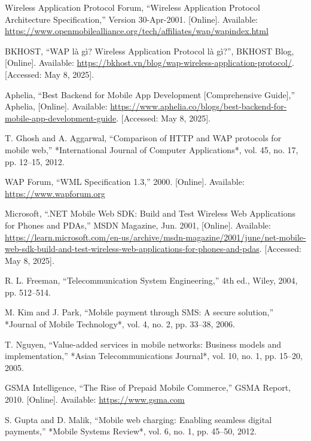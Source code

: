 \documentclass[12pt]{report}
\begin{document}
\begin{thebibliography}{1}
  Wireless Application Protocol Forum, ``Wireless Application Protocol Architecture Specification,'' Version 30-Apr-2001. [Online]. Available: \url{https://www.openmobilealliance.org/tech/affiliates/wap/wapindex.html}

  BKHOST, “WAP là gì? Wireless Application Protocol là gì?”, BKHOST Blog, [Online]. Available: \url{https://bkhost.vn/blog/wap-wireless-application-protocol/}. [Accessed: May 8, 2025].


  Aphelia, “Best Backend for Mobile App Development [Comprehensive Guide],” Aphelia, [Online]. Available: \url{https://www.aphelia.co/blogs/best-backend-for-mobile-app-development-guide}. [Accessed: May 8, 2025].


  T. Ghosh and A. Aggarwal, ``Comparison of HTTP and WAP protocols for mobile web,'' *International Journal of Computer Applications*, vol. 45, no. 17, pp. 12–15, 2012.

  WAP Forum, ``WML Specification 1.3,'' 2000. [Online]. Available: \url{https://www.wapforum.org}

  Microsoft, “.NET Mobile Web SDK: Build and Test Wireless Web Applications for Phones and PDAs,” MSDN Magazine, Jun. 2001, [Online]. Available: \url{https://learn.microsoft.com/en-us/archive/msdn-magazine/2001/june/net-mobile-web-sdk-build-and-test-wireless-web-applications-for-phones-and-pdas}. [Accessed: May 8, 2025].


  R. L. Freeman, ``Telecommunication System Engineering,'' 4th ed., Wiley, 2004, pp. 512–514.

  M. Kim and J. Park, ``Mobile payment through SMS: A secure solution,'' *Journal of Mobile Technology*, vol. 4, no. 2, pp. 33–38, 2006.

  T. Nguyen, ``Value-added services in mobile networks: Business models and implementation,'' *Asian Telecommunications Journal*, vol. 10, no. 1, pp. 15–20, 2005.

  GSMA Intelligence, ``The Rise of Prepaid Mobile Commerce,'' GSMA Report, 2010. [Online]. Available: \url{https://www.gsma.com}

  S. Gupta and D. Malik, ``Mobile web charging: Enabling seamless digital payments,'' *Mobile Systems Review*, vol. 6, no. 1, pp. 45–50, 2012.


\end{thebibliography}
\end{document}
